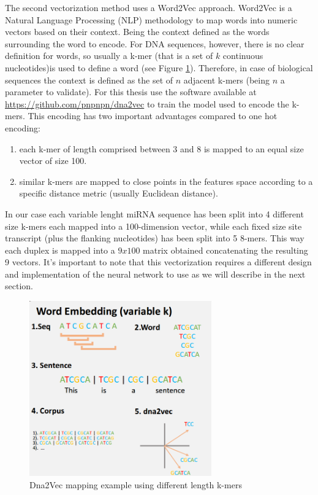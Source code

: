 The second vectorization method uses a Word2Vec approach. Word2Vec \cite{word2vec} is a Natural Language Processing (NLP) methodology to map words into numeric vectors based on their context. Being the context defined as the words surrounding the word to encode. For DNA sequences, however, there is no clear definition for words, so usually a k-mer (that is a set of $k$ continuous nucleotides)is used to define a word (see Figure \ref{fig:dna2vec}). Therefore, in case of biological sequences the context is defined as the set of $n$ adjacent k-mers (being $n$ a parameter to validate). For this thesis use the software available at \url{https://github.com/pnpnpn/dna2vec} to train the model used to encode the k-mers. This encoding has two important advantages compared to one hot encoding:

\begin{enumerate}
	\item each k-mer of length comprised between 3 and 8 is mapped to an equal size vector of size 100.
	\item similar k-mers are mapped to close points in the features space according to a specific distance metric (usually Euclidean distance).
\end{enumerate}

In our case each variable lenght miRNA sequence has been split into 4 different size k-mers each mapped into a 100-dimension vector, while each fixed size site transcript (plus the flanking nucleotides) has been split into 5 8-mers. This way each duplex is mapped into a $9x100$ matrix obtained concatenating the resulting 9 vectors. It's important to note that this vectorization requires a different design and implementation of the neural network to use as we will describe in the next section.

\begin{figure}[hbt!]
	\centering
	\includegraphics[width=0.7\textwidth, height=0.3\textheight]{Figures/dna2vec}
	\caption{Dna2Vec mapping example using different length k-mers}
	\label{fig:dna2vec}
\end{figure}

